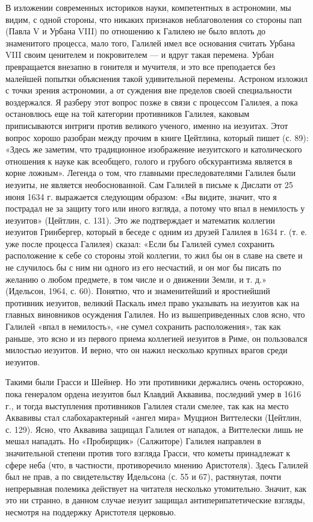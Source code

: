 В изложении современных историков науки, компетентных в астрономии, мы
видим,  с  одной  стороны,  что никаких  признаков  неблаговоления  со
стороны пап  (Павла V и  Урбана VIII) по  отношению к Галилею  не было
вплоть до знаменитого процесса, мало  того, Галилей имел все основания
считать Урбана VIII  своим ценителем и покровителем ---  и вдруг такая
перемена. Урбан  превращается внезапно  в гонителя  и мучителя,  и это
все  преподается без  малейшей попытки  объяснения такой  удивительной
перемены. Астроном  изложил с точки  зрения астрономии, а  от суждения
вне пределов  своей специальности  воздержался. Я разберу  этот вопрос
позже  в связи  с процессом  Галилея, а  пока остановлюсь  еще на  той
категории  противников Галилея,  каковым приписываются  интриги против
великого  ученого, именно  на  иезуитах. Этот  вопрос хорошо  разобран
между  прочим в  книге  Цейтлина,  который пишет  (с.  89): «Здесь  же
заметим,  что  традиционное  изображение иезуитского  и  католического
отношения  к  науке  как  всеобщего, голого  и  грубого  обскурантизма
является в корне ложным». Легенда о том, что главными преследователями
Галилея были иезуиты, не является необоснованной. Сам Галилей в письме
к Дислати от 25 июня 1634 г. выражается следующим образом: «Вы видите,
значит,  что я  пострадал  не  за защиту  того  или  иного взгляда,  а
потому что  впал в  немилость у  иезуитов» (Цейтлин,  с. 131).  Это же
подтверждает  и  математик  коллегии иезуитов  Гринбергер,  который  в
беседе с одним из  друзей Галилея в 1634 г. (т.  е. уже после процесса
Галилея) сказал: «Если бы Галилей  сумел сохранить расположение к себе
со стороны этой коллегии, то жил бы он в славе на свете и не случилось
бы с ним ни  одного из его несчастий, и он мог бы  писать по желанию о
любом предмете,  в том числе и  о движении Земли, и  т. д.» (Идельсон,
1964, с.  60). Понятно,  что и  знаменитейший и  яростнейший противник
иезуитов,  великий Паскаль  имел право  указывать на  иезуитов как  на
главных виновников осуждения Галилея. Но из вышеприведенных слов ясно,
что Галилей «впал в немилость», «не сумел сохранить расположения», так
как раньше, это ясно и из первого приема коллегией иезуитов в Риме, он
пользовался милостью иезуитов. И верно, что он нажил несколько крупных
врагов среди иезуитов.

Такими  были  Грасси  и  Шейнер. Но  эти  противники  держались  очень
осторожно,  пока  генералом  ордена  иезуитов  был  Клавдий  Аквавива,
последний  умер в  1616 г.,  и тогда  выступления противников  Галилея
стали  смелее,  так  как   на  место  Аквавивы  стал  слабохарактерный
«ангел  мира»   Муццион  Виттелески  (Цейтлин,  с.   129).  Ясно,  что
Аквавива  защищал  Галилея от  нападок,  а  Виттелески лишь  не  мешал
нападать. Но «Пробирщик» (Салжиторе)  Галилея направлен в значительной
степени против  того взгляда  Грасси, что  кометы принадлежат  к сфере
неба  (что,  в  частности,  противоречило  мнению  Аристотеля).  Здесь
Галилей  был не  прав,  а по  свидетельству Идельсона  (с.  55 и  67),
растянутая, почти непрерывная полемика действует на читателя несколько
утомительно.  Значит,  как это  ни  странно,  в данном  случае  иезуит
защищал антиперипатетические взгляды, несмотря на поддержку Аристотеля
церковью.

